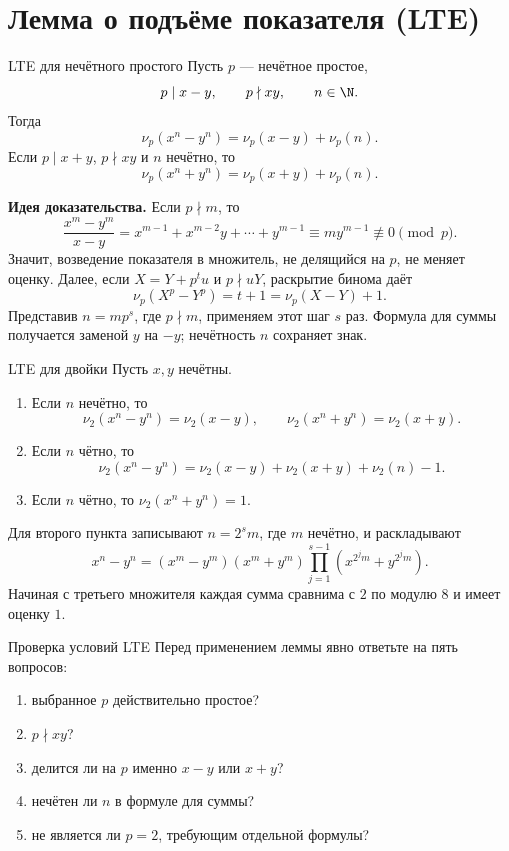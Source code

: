 \section{Лемма о подъёме показателя (LTE)}

\begin{theorembox}{LTE для нечётного простого}
Пусть $p$ --- нечётное простое,
\[
  p\mid x-y,
  \qquad p\nmid xy,
  \qquad n\in\N.
\]
Тогда
\[
  \boxed{\nu_p(x^n-y^n)=\nu_p(x-y)+\nu_p(n)}.
\]
Если $p\mid x+y$, $p\nmid xy$ и $n$ нечётно, то
\[
  \boxed{\nu_p(x^n+y^n)=\nu_p(x+y)+\nu_p(n)}.
\]
\end{theorembox}

\textbf{Идея доказательства.}
Если $p\nmid m$, то
\[
  \frac{x^m-y^m}{x-y}
  =x^{m-1}+x^{m-2}y+\cdots+y^{m-1}
  \equiv my^{m-1}\not\equiv0\pmod p.
\]
Значит, возведение показателя в множитель, не делящийся на $p$, не
меняет оценку. Далее, если $X=Y+p^tu$ и $p\nmid uY$, раскрытие бинома
даёт
\[
  \nu_p(X^p-Y^p)=t+1=\nu_p(X-Y)+1.
\]
Представив $n=mp^s$, где $p\nmid m$, применяем этот шаг $s$ раз.
Формула для суммы получается заменой $y$ на $-y$; нечётность $n$
сохраняет знак.

\begin{theorembox}{LTE для двойки}
Пусть $x,y$ нечётны.
\begin{enumerate}
  \item Если $n$ нечётно, то
        \[
          \nu_2(x^n-y^n)=\nu_2(x-y),
          \qquad
          \nu_2(x^n+y^n)=\nu_2(x+y).
        \]
  \item Если $n$ чётно, то
        \[
          \boxed{\nu_2(x^n-y^n)
          =\nu_2(x-y)+\nu_2(x+y)+\nu_2(n)-1}.
        \]
  \item Если $n$ чётно, то $\nu_2(x^n+y^n)=1$.
\end{enumerate}
\end{theorembox}

Для второго пункта записывают $n=2^sm$, где $m$ нечётно, и раскладывают
\[
  x^n-y^n=(x^m-y^m)(x^m+y^m)
  \prod_{j=1}^{s-1}(x^{2^jm}+y^{2^jm}).
\]
Начиная с третьего множителя каждая сумма сравнима с $2$ по модулю
$8$ и имеет оценку $1$.

\begin{warningbox}{Проверка условий LTE}
Перед применением леммы явно ответьте на пять вопросов:
\begin{enumerate}
  \item выбранное $p$ действительно простое?
  \item $p\nmid xy$?
  \item делится ли на $p$ именно $x-y$ или $x+y$?
  \item нечётен ли $n$ в формуле для суммы?
  \item не является ли $p=2$, требующим отдельной формулы?
\end{enumerate}
\end{warningbox}


